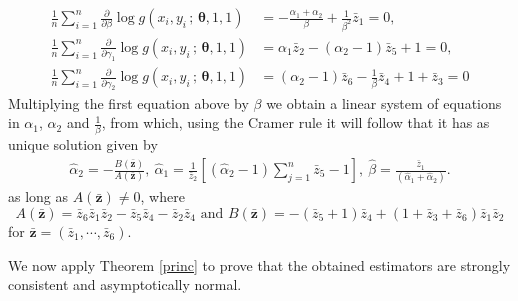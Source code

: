 \documentclass[10pt,a4paper,onecolumn]{article} %
\newcommand{\bs}{\boldsymbol}
\begin{document}
\begin{align*}
\frac{1}{n}\sum_{i=1}^n\frac{\partial}{\partial \beta}  \log g(x_i,y_i\,;\,\bs{\theta},1,1) &= -\frac{\alpha_1 + \alpha_2}{\beta} + \frac{1}{\beta^2} \bar{z}_1 = 0, \\
\frac{1}{n}\sum_{i=1}^n\frac{\partial}{\partial \gamma_1}  \log g(x_i,y_i\,;\,\bs{\theta},1,1) &= \alpha_1 \bar{z}_2 - (\alpha_2 - 1) \bar{z}_5 + 1 = 0, \\
\frac{1}{n}\sum_{i=1}^n \frac{\partial}{\partial \gamma_2}  \log g(x_i,y_i\,;\,\bs{\theta},1,1) &= (\alpha_2 - 1) \bar{z}_6 - \frac{1}{\beta}\bar{z}_4 + 1 + \bar{z}_3 = 0
\end{align*}
Multiplying the first equation above by $\beta$ we obtain a linear system of equations in $\alpha_1$, $\alpha_2$ and $\frac{1}{\beta}$, from which, using the Cramer rule it will follow that it has as unique solution given by
\begin{align*}
\hat{\alpha}_2 = -\frac{B(\bs{\bar{z}})}{A(\bs{\bar{z}})}, \
\hat{\alpha}_1 = \frac{1}{\bar{z}_2} \left[ (\hat{\alpha}_2 - 1) \sum_{j=1}^{n} \bar{z}_5 - 1 \right], \
\hat{\beta} = \frac{\bar{z}_1}{ (\hat{\alpha}_1 + \hat{\alpha}_2)}.
\end{align*}
as long as $A(\bs{\bar{z}})\neq 0$, where
\begin{equation*}A(\bs{\bar{z}})=\bar{z}_6\bar{z}_1\bar{z}_2-\bar{z}_5\bar{z}_4-\bar{z}_2\bar{z}_4\mbox{ and }B(\bs{\bar{z}}) = -(\bar{z}_5+1)\bar{z}_4 + (1+\bar{z}_3+\bar{z}_6)\bar{z}_1\bar{z}_2
\end{equation*}
for $\bs{\bar{z}}=\left(\bar{z}_1,\cdots,\bar{z}_6\right)$.

We now apply Theorem \ref{princ} to prove that the obtained estimators are strongly consistent and asymptotically normal.
\end{document}
